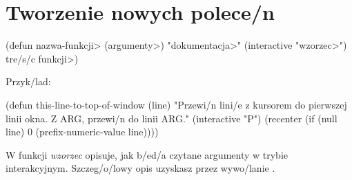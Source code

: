 \section{Tworzenie nowych polece/n}

\beginexample%
(defun \<nazwa-funkcji> (\<argumenty>)
  "\<dokumentacja>"
  (interactive "\<wzorzec>")
  \<tre/s/c funkcji>)
\endexample

Przyk/lad:

\beginexample%
(defun this-line-to-top-of-window (line)
  "Przewi/n lini/e z kursorem do pierwszej linii okna.
Z ARG, przewi/n do linii ARG."
  (interactive "P")
  (recenter (if (null line)
                0
              (prefix-numeric-value line))))
\endexample

W funkcji  {\it wzorzec\/} opisuje, jak b/ed/a czytane
argumenty w trybie interakcyjnym. Szczeg/o/lowy opis uzyskasz
przez wywo/lanie .

\copyrightnotice

\bye

